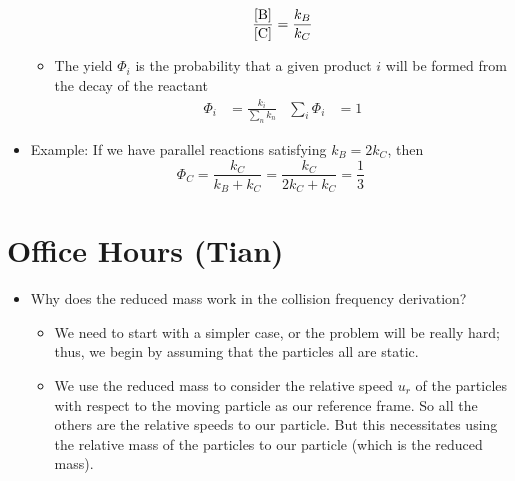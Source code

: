 \documentclass[../notes.tex]{subfiles}
\begin{document}
\begin{itemize}
\begin{itemize}
\begin{equation*}
            \frac{[\ce{B}]}{[\ce{C}]} = \frac{k_B}{k_C}
        \end{equation*}
        \item The yield $\Phi_i$ is the probability that a given product $i$ will be formed from the decay of the reactant
        \begin{align*}
            \Phi_i &= \frac{k_i}{\sum_nk_n}&
            \sum_i\Phi_i &= 1
        \end{align*}
    \end{itemize}
    \item Example: If we have parallel reactions satisfying $k_B=2k_C$, then
    \begin{equation*}
        \Phi_C = \frac{k_C}{k_B+k_C}
        = \frac{k_C}{2k_C+k_C}
        = \frac{1}{3}
    \end{equation*}
\end{itemize}



\section{Office Hours (Tian)}
\begin{itemize}
    \item Why does the reduced mass work in the collision frequency derivation?
    \begin{itemize}
        \item We need to start with a simpler case, or the problem will be really hard; thus, we begin by assuming that the particles all are static.
        \item We use the reduced mass to consider the relative speed $u_r$ of the particles with respect to the moving particle as our reference frame. So all the others are the relative speeds to our particle. But this necessitates using the relative mass of the particles to our particle (which is the reduced mass).
    \end{itemize}
\end{itemize}
\end{document}
